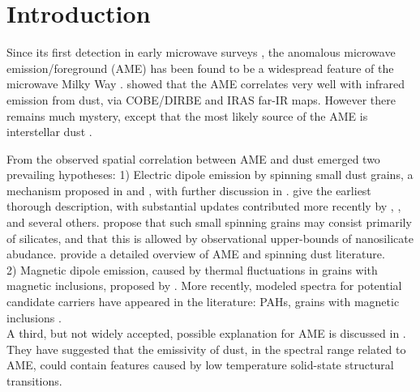 \documentclass[preprint2,longabstract]{aastex}
\begin{document}


\maketitle

\section{Introduction}

     Since its first detection in early microwave surveys , the anomalous microwave emission/foreground (AME) has been found to be a widespread feature of the microwave Milky Way \citep{dickinson13r}. \cite{kogut96,deoliveiracosta97,leitch98} showed that the AME correlates very well with infrared emission from dust, via COBE/DIRBE and IRAS far-IR maps. However there remains much mystery, except that the most likely source of the AME is interstellar dust \citep{ysard10a,tibbs11,hensley16}.

     From the observed spatial correlation between AME and dust emerged two prevailing hypotheses:
    1) Electric dipole emission by spinning small dust grains, a mechanism proposed in \cite{erickson57} and \cite{hoyle70}, with further discussion in \cite{ferrara94}. \cite{draine98b} give the earliest thorough description, with substantial updates contributed more recently by \cite{ysard10a}, \cite{ali-haimoud09}, \cite{hoang10} and several others. \cite{hensley17a} propose that such small spinning grains may consist primarily of silicates, and that this is allowed by observational upper-bounds of nanosilicate abudance. \cite{dickinson13r} provide a detailed overview of AME and spinning dust literature. \\
    2) Magnetic dipole emission, caused by thermal fluctuations in grains with magnetic inclusions, proposed by \cite{draine99}.
     More recently, modeled spectra for potential candidate carriers have appeared in the literature: PAHs, grains with magnetic inclusions \citep{draine13, ali-haimoud14, hoang16a}.\\

    A third, but not widely accepted, possible explanation for AME is discussed in \cite{jones09}. They have suggested that the emissivity of dust, in the spectral range related to AME, could contain features caused by low temperature solid-state structural transitions.
\end{document}
